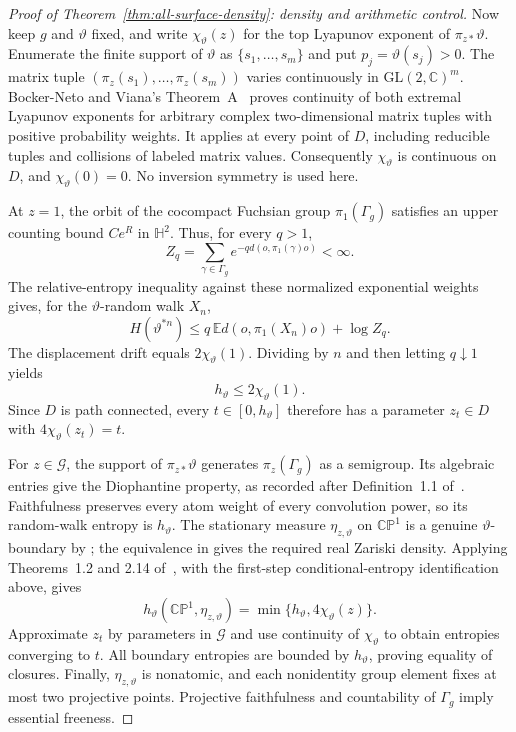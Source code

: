 \documentclass[11pt,letterpaper]{amsart}
\theoremstyle{definition}
\theoremstyle{remark}
\numberwithin{equation}{section}
\begin{document}
\begin{proof}[Proof of Theorem~\ref{thm:all-surface-density}: density and arithmetic control]
Now keep $g$ and $\vartheta$ fixed, and write
$\chi_\vartheta(z)$ for the top Lyapunov exponent of
$\pi_{z*}\vartheta$. Enumerate the finite support of $\vartheta$
as $\{s_1,\ldots,s_m\}$ and put $p_j=\vartheta(s_j)>0$.
The matrix tuple
$(\pi_z(s_1),\ldots,\pi_z(s_m))$ varies continuously in
$\mathrm{GL}(2,\mathbb C)^m$. Bocker-Neto and Viana's
Theorem~A~\cite{BV} proves continuity of both extremal Lyapunov
exponents for arbitrary complex two-dimensional matrix tuples with
positive probability weights. It applies at every point of $D$,
including reducible tuples and collisions of labeled matrix values.
Consequently $\chi_\vartheta$ is continuous on $D$, and
$\chi_\vartheta(0)=0$. No inversion symmetry is used here.

At $z=1$, the orbit of the cocompact Fuchsian group
$\pi_1(\Gamma_g)$ satisfies an upper counting bound $Ce^R$ in
$\mathbb H^2$. Thus, for every $q>1$,
\[
 Z_q=\sum_{\gamma\in\Gamma_g}
       e^{-q d(o,\pi_1(\gamma)o)}<\infty.
\]
The relative-entropy inequality against these normalized exponential
weights gives, for the $\vartheta$-random walk $X_n$,
\[
 H(\vartheta^{*n})
 \le q\,\mathbb E d(o,\pi_1(X_n)o)+\log Z_q.
\]
The displacement drift equals $2\chi_\vartheta(1)$. Dividing by $n$
and then letting $q\downarrow1$ yields
\[
 h_\vartheta\le2\chi_\vartheta(1).
\]
Since $D$ is path connected, every $t\in[0,h_\vartheta]$ therefore
has a parameter $z_t\in D$ with $4\chi_\vartheta(z_t)=t$.

For $z\in\mathcal G$, the support of $\pi_{z*}\vartheta$ generates
$\pi_z(\Gamma_g)$ as a semigroup. Its algebraic entries give the
Diophantine property, as recorded after Definition~1.1 of~\cite{RR}.
Faithfulness preserves every atom weight of every convolution power,
so its random-walk entropy is $h_\vartheta$. The stationary measure
$\eta_{z,\vartheta}$ on $\mathbb{CP}^1$ is a genuine
$\vartheta$-boundary by \cite[Theorem~2.3]{DF}; the equivalence in
\cite[Section~2.9]{RR} gives the required real Zariski density.
Applying Theorems~1.2 and 2.14 of~\cite{RR},
with the first-step conditional-entropy identification above,
gives
\[
 h_\vartheta(\mathbb{CP}^1,\eta_{z,\vartheta})
 =\min\{h_\vartheta,4\chi_\vartheta(z)\}.
\]
Approximate $z_t$ by parameters in $\mathcal G$ and use continuity
of $\chi_\vartheta$ to obtain entropies converging to $t$.
All boundary entropies are bounded by $h_\vartheta$, proving equality
of closures. Finally, $\eta_{z,\vartheta}$ is nonatomic, and each
nonidentity group element fixes at most two projective points.
Projective faithfulness and countability of $\Gamma_g$ imply essential
freeness.
\end{proof}
\end{document}
